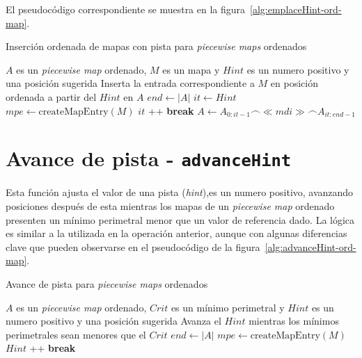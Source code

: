 El pseudocódigo correspondiente se muestra en la figura~\ref{alg:emplaceHint-ord-map}.

\begin{algorithm}
\caption{Inserción ordenada de mapas con pista para \textit{piecewise maps} ordenados}
\label{alg:emplaceHint-ord-map}
\begin{algorithmic}[1]
\Require $A$ es un \textit{piecewise map} ordenado, $M$ es un mapa y $Hint$ es un numero positivo y una posición sugerida
\Ensure Inserta la entrada correspondiente a $M$ en posición ordenada a partir del $Hint$ en $A$
  \State $end \gets |A|$ 
  \State $it \gets Hint$ 
  \State $mpe \gets \mathrm{createMapEntry}(M)$
      \State $it$ \!+\!+
    \Else
      \State \textbf{break}
    \EndIf
  \EndWhile
  \State $A\gets A_{0:it-1} \frown \ll mdi\gg \frown A_{it:end-1}$
\EndFunction
\end{algorithmic}
\end{algorithm}


\section*{Avance de pista - \texttt{advanceHint}}

Esta función ajusta el valor de una pista (\textit{hint}),es un numero positivo, avanzando posiciones después de esta mientras los mapas de un \textit{piecewise map} ordenado presenten un mínimo perimetral menor que un valor de referencia dado. La lógica es similar a la utilizada en la operación anterior, aunque con algunas diferencias clave que pueden observarse en el pseudocódigo de la figura~\ref{alg:advanceHint-ord-map}.

\begin{algorithm}
\caption{Avance de pista para \textit{piecewise maps} ordenados}
\label{alg:advanceHint-ord-map}
\begin{algorithmic}[1]
\Require $A$ es un \textit{piecewise map} ordenado, $Crit$ es un mínimo perimetral y $Hint$ es un numero positivo y una posición sugerida
\Ensure Avanza el $Hint$ mientras los mínimos perimetrales sean menores que el $Crit$
  \State $end \gets |A|$ 
  \State $mpe \gets \mathrm{createMapEntry}(M)$
      \State $Hint$ \!+\!+
    \Else
      \State \textbf{break}
    \EndIf
  \EndWhile
\EndFunction
\end{algorithmic}
\end{algorithm}


